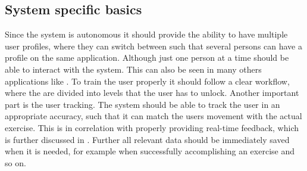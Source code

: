 \subsection{System specific basics}\label{systemBasics}
Since the system is autonomous it should provide the ability to have multiple user profiles, where they can switch between such that several persons can have a profile on the same application. Although just one person at a time should be able to interact with the system. This can also be seen in many others applications like \textbf{\todo{[CITE]}}. To train the user properly it should follow a clear workflow, where the \textbf{} are divided into levels that the user has to unlock. Another important part is the user tracking. The system should be able to track the user in an appropriate accuracy, such that it can match the users movement with the actual exercise. This is in correlation with properly providing real-time feedback, which is further discussed in \textbf{}. Further all relevant data should be immediately saved when it is needed, for example when successfully accomplishing an exercise and so on.

\begin{comment}
- System should be able to track user appropriately
- All relevant data should be immediately saved when it is needed (unlocking exercise/stage, failing/accomplish exercise)
- Information about where the user currently is should be given --> title
- User selection
- Also a possibility to go to the last screen if she misclicks should be given.
\end{comment}